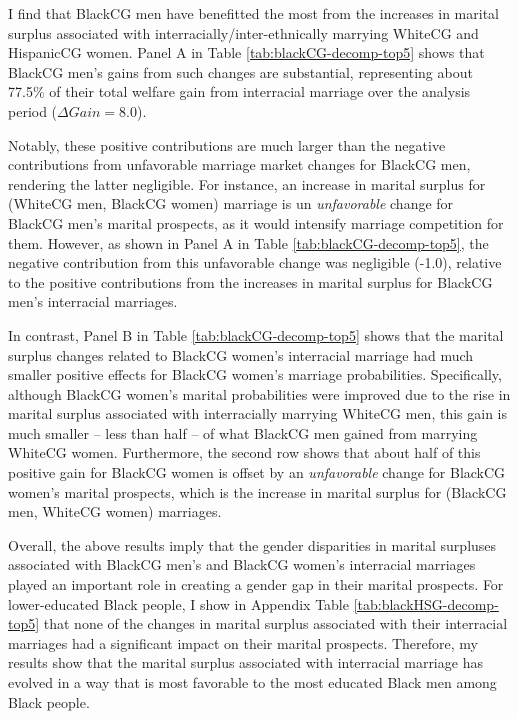I find that BlackCG men have benefitted the most from the increases in marital surplus associated with interracially/inter-ethnically marrying WhiteCG and HispanicCG women. Panel A in Table \ref{tab:blackCG-decomp-top5} shows that BlackCG men's gains from such changes are substantial, representing about 77.5\% of their total welfare gain from interracial marriage over the analysis period ($\Delta Gain = 8.0$). 

Notably, these positive contributions are much larger than the negative contributions from unfavorable marriage market changes for BlackCG men, rendering the latter negligible. For instance, an increase in marital surplus for (WhiteCG men, BlackCG women) marriage is un \textit{unfavorable} change for BlackCG men's marital prospects, as it would intensify marriage competition for them. However, as shown in Panel A in Table \ref{tab:blackCG-decomp-top5}, the negative contribution from this unfavorable change was negligible (-1.0), relative to the positive contributions from the increases in marital surplus for BlackCG men's interracial marriages. 

In contrast, Panel B in Table \ref{tab:blackCG-decomp-top5} shows that the marital surplus changes related to BlackCG women's interracial marriage had much smaller positive effects for BlackCG women's marriage probabilities. Specifically, although BlackCG women's marital probabilities were improved due to the rise in marital surplus associated with interracially marrying WhiteCG men, this gain is much smaller -- less than half -- of what BlackCG men gained from marrying WhiteCG women. Furthermore, the second row shows that about half of this positive gain for BlackCG women is offset by an \textit{unfavorable} change for BlackCG women's marital prospects, which is the increase in marital surplus for (BlackCG men, WhiteCG women) marriages. 

Overall, the above results imply that the gender disparities in marital surpluses associated with BlackCG men's and BlackCG women's interracial marriages played an important role in creating a gender gap in their marital prospects. For lower-educated Black people, I show in Appendix Table \ref{tab:blackHSG-decomp-top5} that none of the changes in marital surplus associated with their interracial marriages had a significant impact on their marital prospects. Therefore, my results show that the marital surplus associated with interracial marriage has evolved in a way that is most favorable to the most educated Black men among Black people. 

